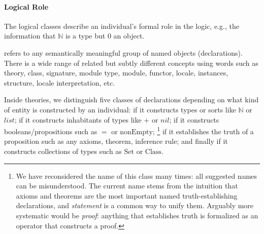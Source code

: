 \paragraph{Logical Role}
The logical classes describe an individual's formal role in the logic, e.g., the information that $\mathbb{N}$ is a type but $0$ an object.

 refers to any semantically meaningful group of named objects (declarations).
There is a wide range of related but subtly different concepts using words such as theory, class, signature, module type, module, functor, locale, instances, structure, locale interpretation, etc.

\newcommand{\truthType}{\ind{predicate}\xspace}
\newcommand{\truthObject}{\ind{statement}\xspace}

Inside theories, we distinguish five classes of declarations depending on what kind of entity is constructed by an individual:
 if it constructs types or sorts like $\mathbb{N}$ or $list$;  if it constructs inhabitants of types like $+$ or $nil$; \truthType{\isabelle\coq} if it constructs booleans/propositions such as $=$ or $\mathrm{nonEmpty}$; \truthObject{\isabelle\coq}%
\footnote{We have reconsidered the name of this class many times: all suggested names can be misunderstood.
The current name stems from the intuition that axioms and theorems are the most important named truth-establishing declarations, and \emph{statement} is a common way to unify them.
Arguably more systematic would be \emph{proof}: anything that establishes truth is formalized as an operator that constructs a proof.}
if it establishes the truth of a proposition such as any axioms, theorem, inference rule; and finally  if it constructs collections of types such as $\mathrm{Set}$ or $\mathrm{Class}$.

